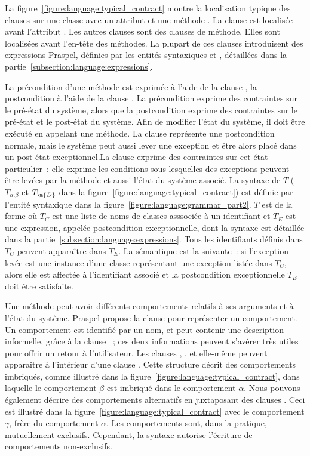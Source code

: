 La figure~\ref{figure:language:typical_contract} montre la localisation typique
des clauses sur une classe  avec un attribut  et une méthode
. La clause \ainvariant est localisée avant l'attribut .  Les
autres clauses sont des clauses de méthode. Elles sont localisées avant
l'en-tête des méthodes. La plupart de ces clauses introduisent des expressions
Praspel, définies par les entités syntaxiques  et
, détaillées dans la
partie~\ref{subsection:language:expressions}.

La précondition d'une méthode est exprimée à l'aide de la clause \arequires, la
postcondition à l'aide de la clause \aensures. La précondition exprime des
contraintes sur le {\strong pré-état} du système, alors que la postcondition
exprime des contraintes sur le pré-état et le {\strong post-état} du système.
Afin de modifier l'état du système, il doit être exécuté en appelant une
méthode. La clause \aensures représente une {\strong postcondition normale},
mais le système peut aussi lever une exception et être alors placé dans un
{\strong post-état exceptionnel}.La clause \athrowable exprime des contraintes
sur cet état particulier~: elle exprime les conditions sous lesquelles des
exceptions peuvent être levées par la méthode et aussi l'état du système
associé. La syntaxe de $T$ ($T_{\alpha.\beta}$ et $T_\m{D}$ dans la
figure~\ref{figure:language:typical_contract}) est définie par l'entité
syntaxique  dans la
figure~\ref{figure:language:grammar_part2}. $T$ est de la forme  où $T_C$ est une liste de noms de classes asssociée à un identifiant et
$T_E$ est une expression, appelée {\strong postcondition exceptionnelle}, dont
la syntaxe est détaillée dans la partie~\ref{subsection:language:expressions}.
Tous les identifiants définis dans $T_C$ peuvent apparaître dans $T_E$. La
sémantique est la suivante~: si l'exception levée est une instance d'une classe
représentant une exception listée dans $T_C$, alors elle est affectée à
l'identifiant associé et la postcondition exceptionnelle $T_E$ doit être
satisfaite.

Une méthode peut avoir différents {\strong comportements} relatifs à ses
arguments et à l'état du système. Praspel propose la clause \abehavior pour
représenter un comportement. Un comportement est identifié par un nom, et peut
contenir une description informelle, grâce à la clause \adescription~; ces deux
informations peuvent s'avérer très utiles pour offrir un retour à l'utilisateur.
Les clauses \arequires, \aensures, \athrowable et \abehavior elle-même peuvent
apparaître à l'intérieur d'une clause \abehavior. Cette structure décrit des
comportements imbriqués, comme illustré dans la
figure~\ref{figure:language:typical_contract}, dans laquelle le comportement
$\beta$ est imbriqué dans le comportement $\alpha$. Nous pouvons également
décrire des comportements alternatifs en juxtaposant des clauses \abehavior.
Ceci est illustré dans la figure~\ref{figure:language:typical_contract} avec le
comportement $\gamma$, frère du comportement $\alpha$. Les comportements sont,
dans la pratique, mutuellement exclusifs. Cependant, la syntaxe autorise
l'écriture de comportements non-exclusifs.

